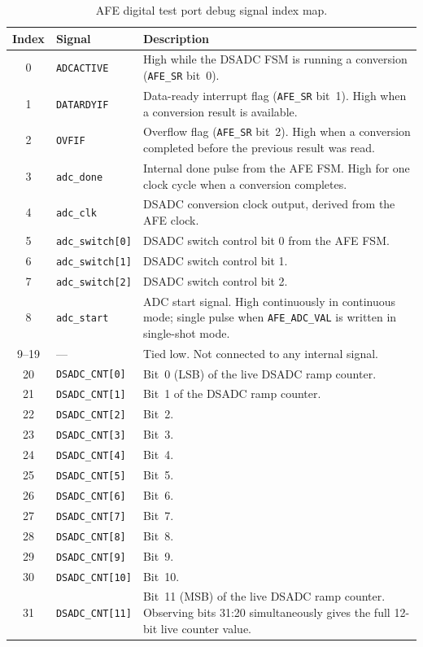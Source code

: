 \begin{table}[h]
\centering
\begin{tabularx}{\textwidth}{c l X}
\hline
\textbf{Index} & \textbf{Signal} & \textbf{Description} \\
\hline
0  & \texttt{ADCACTIVE}    & High while the DSADC FSM is running a conversion (\texttt{AFE\_SR} bit~0). \\
1  & \texttt{DATARDYIF}    & Data-ready interrupt flag (\texttt{AFE\_SR} bit~1). High when a conversion result is available. \\
2  & \texttt{OVFIF}        & Overflow flag (\texttt{AFE\_SR} bit~2). High when a conversion completed before the previous result was read. \\
3  & \texttt{adc\_done}    & Internal done pulse from the AFE FSM. High for one clock cycle when a conversion completes. \\
4  & \texttt{adc\_clk}     & DSADC conversion clock output, derived from the AFE clock. \\
5  & \texttt{adc\_switch[0]} & DSADC switch control bit 0 from the AFE FSM. \\
6  & \texttt{adc\_switch[1]} & DSADC switch control bit 1. \\
7  & \texttt{adc\_switch[2]} & DSADC switch control bit 2. \\
8  & \texttt{adc\_start}   & ADC start signal. High continuously in continuous mode; single pulse when \texttt{AFE\_ADC\_VAL} is written in single-shot mode. \\
9--19  & ---               & Tied low. Not connected to any internal signal. \\
20 & \texttt{DSADC\_CNT[0]}  & Bit~0 (LSB) of the live DSADC ramp counter. \\
21 & \texttt{DSADC\_CNT[1]}  & Bit~1 of the DSADC ramp counter. \\
22 & \texttt{DSADC\_CNT[2]}  & Bit~2. \\
23 & \texttt{DSADC\_CNT[3]}  & Bit~3. \\
24 & \texttt{DSADC\_CNT[4]}  & Bit~4. \\
25 & \texttt{DSADC\_CNT[5]}  & Bit~5. \\
26 & \texttt{DSADC\_CNT[6]}  & Bit~6. \\
27 & \texttt{DSADC\_CNT[7]}  & Bit~7. \\
28 & \texttt{DSADC\_CNT[8]}  & Bit~8. \\
29 & \texttt{DSADC\_CNT[9]}  & Bit~9. \\
30 & \texttt{DSADC\_CNT[10]} & Bit~10. \\
31 & \texttt{DSADC\_CNT[11]} & Bit~11 (MSB) of the live DSADC ramp counter. Observing bits 31:20 simultaneously gives the full 12-bit live counter value. \\
\hline
\end{tabularx}
\caption{AFE digital test port debug signal index map.}
\label{t:afe-dtp}
\end{table}
